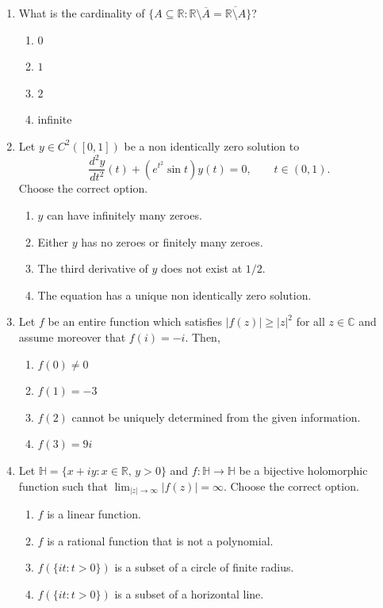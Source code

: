 \documentclass[11pt, a4paper]{article}
\begin{document}
\begin{enumerate}
  \item What is the cardinality of $\{A \subseteq \mathbb{R} : \mathbb{R} \setminus \overline{A} = \overline{\mathbb{R} \setminus A}\}$?
  \begin{enumerate}[label=(\alph*)]
    \item $0$
    \item $1$
    \item $2$
    \item infinite
  \end{enumerate}

  \item Let $y \in C^2([0,1])$ be a non identically zero solution to
  \[
    \frac{d^2 y}{dt^2}(t) + (e^{t^2} \sin t) y(t) = 0, \qquad t \in (0,1).
  \]
  Choose the correct option.
  \begin{enumerate}[label=(\alph*)]
    \item $y$ can have infinitely many zeroes.
    \item Either $y$ has no zeroes or finitely many zeroes.
    \item The third derivative of $y$ does not exist at $1/2$.
    \item The equation has a unique non identically zero solution.
  \end{enumerate}

  \item Let $f$ be an entire function which satisfies $|f(z)| \ge |z|^2$ for all $z \in \mathbb{C}$ and assume moreover that $f(i) = -i$. Then,
  \begin{enumerate}[label=(\alph*)]
    \item $f(0) \ne 0$
    \item $f(1) = -3$
    \item $f(2)$ cannot be uniquely determined from the given information.
    \item $f(3) = 9i$
  \end{enumerate}

  \item Let $\mathbb{H} = \{x + iy : x \in \mathbb{R}, \, y > 0\}$ and $f: \mathbb{H} \to \mathbb{H}$ be a bijective holomorphic function such that $\lim_{|z| \to \infty} |f(z)| = \infty$. Choose the correct option.
  \begin{enumerate}[label=(\alph*)]
    \item $f$ is a linear function.
    \item $f$ is a rational function that is not a polynomial.
    \item $f(\{it : t > 0\})$ is a subset of a circle of finite radius.
    \item $f(\{it : t > 0\})$ is a subset of a horizontal line.
  \end{enumerate}


\end{enumerate}
\end{document}
